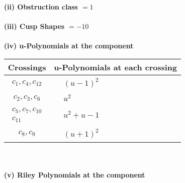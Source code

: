 \documentclass[1p]{elsarticle_modified}
\theoremstyle{definition}
\begin{document}
\flushleft \textbf{(ii) Obstruction class $= 1$}\\~\\
\flushleft \textbf{(iii) Cusp Shapes $= -10$}\\~\\
\newpage\renewcommand{\arraystretch}{1}
\flushleft \textbf{(iv) u-Polynomials at the component}\newline \\
\begin{tabular}{m{50pt}|m{274pt}}
Crossings & \hspace{64pt}u-Polynomials at each crossing \\
\hline $$\begin{aligned}c_{1},c_{4},c_{12}\end{aligned}$$&$\begin{aligned}
&(u-1)^2
\end{aligned}$\\
\hline $$\begin{aligned}c_{2},c_{3},c_{6}\end{aligned}$$&$\begin{aligned}
&u^2
\end{aligned}$\\
\hline $$\begin{aligned}c_{5},c_{7},c_{10}\\c_{11}\end{aligned}$$&$\begin{aligned}
&u^2+u-1
\end{aligned}$\\
\hline $$\begin{aligned}c_{8},c_{9}\end{aligned}$$&$\begin{aligned}
&(u+1)^2
\end{aligned}$\\
\hline
\end{tabular}\\~\\
\newpage\renewcommand{\arraystretch}{1}
\flushleft \textbf{(v) Riley Polynomials at the component}\newline \\
\end{document}
